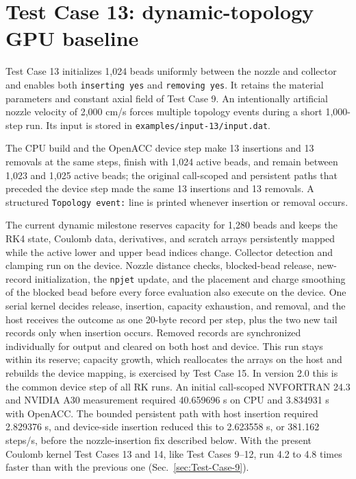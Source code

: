 \section{Test Case 13: dynamic-topology GPU baseline}

Test Case 13 initializes 1,024 beads uniformly between the nozzle and
collector and enables both \texttt{inserting yes} and \texttt{removing yes}.
It retains the material parameters and constant axial field of Test Case 9.
An intentionally artificial nozzle velocity of 2,000 cm/s forces multiple
topology events during a short 1,000-step run. Its input is stored in
\texttt{examples/input-13/input.dat}.

The CPU build and the OpenACC device step make 13 insertions and 13
removals at the same steps, finish with 1,024 active beads, and remain
between 1,023 and 1,025 active beads; the original call-scoped and
persistent paths that preceded the device step made the same 13 insertions
and 13 removals. A
structured \texttt{Topology event:} line is printed whenever insertion or
removal occurs.

The current dynamic milestone reserves capacity for 1,280 beads and keeps the
RK4 state, Coulomb data, derivatives, and scratch arrays persistently mapped
while the active lower and upper bead indices change. Collector detection and
clamping run on the device. Nozzle distance checks, blocked-bead release,
new-record initialization, the \texttt{npjet} update, and the placement and
charge smoothing of the blocked bead before every force evaluation also
execute on the device. One serial kernel decides release, insertion,
capacity exhaustion, and removal, and the host receives the outcome as one
20-byte record per step, plus the two new tail records only when insertion
occurs. Removed records are synchronized individually for output and cleared
on both host and device. This run stays within its reserve; capacity growth,
which reallocates the arrays on the host and rebuilds the device mapping, is
exercised by Test Case 15. In version 2.0 this is the common device
step of all RK runs. An initial call-scoped NVFORTRAN 24.3
and NVIDIA A30 measurement required 40.659696 s on CPU and 3.834931 s with
OpenACC. The bounded persistent path with host insertion required
2.829376 s, and device-side insertion reduced this to 2.623558 s, or
381.162 steps/s, before the nozzle-insertion fix described below. With the
present Coulomb kernel Test Cases 13 and 14, like Test Cases 9--12, run 4.2
to 4.8 times faster than with the previous one
(Sec.~\ref{sec:Test-Case-9}).

